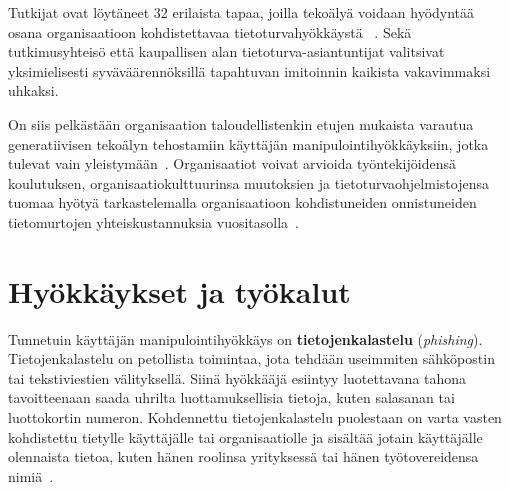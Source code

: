 \begin{otherlanguage}{finnish}
Tutkijat ovat löytäneet 32 erilaista tapaa, joilla tekoälyä voidaan hyödyntää osana organisaatioon kohdistettavaa tietoturvahyökkäystä ~\citep{mirsky_Threat_Offensive_AI_Organizations_2023}. Sekä tutkimusyhteisö että kaupallisen alan tietoturva-asiantuntijat valitsivat yksimielisesti syväväärennöksillä tapahtuvan imitoinnin kaikista vakavimmaksi uhkaksi.


On siis pelkästään organisaation taloudellistenkin etujen mukaista varautua generatiivisen tekoälyn tehostamiin käyttäjän manipulointihyökkäyksiin, jotka tulevat vain yleistymään~\citep{blauth_AI_Crime_Overview_Malicious_Use_Abuse_2022}. Organisaatiot voivat arvioida työntekijöidensä koulutuksen, organisaatiokulttuurinsa muutoksien ja tietoturvaohjelmistojensa tuomaa hyötyä tarkastelemalla organisaatioon kohdistuneiden onnistuneiden tietomurtojen yhteiskustannuksia vuositasolla~\citep{verizon_Data_Breach_Investigations_Report_2024, ibm_Cost_Data_Breach_Report_2024}.







\section*{Hyökkäykset ja työkalut}

Tunnetuin käyttäjän manipulointihyökkäys on \textbf{tietojenkalastelu} (\textit{phishing}). Tietojenkalastelu on petollista toimintaa, jota tehdään useimmiten sähköpostin tai tekstiviestien välityksellä. Siinä hyökkääjä esiintyy luotettavana tahona tavoitteenaan saada uhrilta luottamuksellisia tietoja, kuten salasanan tai luottokortin numeron. Kohdennettu tietojenkalastelu puolestaan on varta vasten kohdistettu tietylle käyttäjälle tai organisaatiolle ja sisältää jotain käyttäjälle olennaista tietoa, kuten hänen roolinsa yrityksessä tai hänen työtovereidensa nimiä~\citep{wang_Defining_Social_Engineering_2020}.


\end{otherlanguage}
